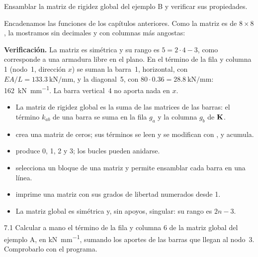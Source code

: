 \begin{problemaresuelto}
Ensamblar la matriz de rigidez global del ejemplo B y verificar sus
propiedades.

\solucion
Encadenamos las funciones de los capítulos anteriores. Como la matriz es de
$8\times8$, la mostramos sin decimales y con columnas más angostas:

\textbf{Verificación.} La matriz es simétrica y su rango es
$5 = 2 \cdot 4 - 3$, como corresponde a una armadura libre en el plano. En el
término de la fila y columna 1 (nodo~1, dirección $x$) se suman la barra~1,
horizontal, con $EA/L = \SI{133.3}{\kilo\newton\per\milli\metre}$, y la
diagonal~5, con $80 \cdot 0.36 = \SI{28.8}{\kilo\newton\per\milli\metre}$:
\SI{162}{\kilo\newton\per\milli\metre}. La barra vertical~4 no aporta nada en
$x$.
\end{problemaresuelto}

\repasoyresumen

\begin{itemize}
  \item La matriz de rigidez global es la suma de las matrices de las barras:
    el término $k_{ab}$ de una barra se suma en la fila $g_a$ y la columna
    $g_b$ de $\mathbf{K}$.
  \item {} crea una matriz de ceros; sus términos se leen y se
    modifican con , y \py{+=} acumula.
  \item {} produce 0, 1, 2 y 3; los bucles pueden anidarse.
  \item {} selecciona un bloque de una matriz y
    permite ensamblar cada barra en una línea.
  \item {} imprime una matriz con sus grados de libertad
    numerados desde 1.
  \item La matriz global es simétrica y, sin apoyos, singular: su rango es
    $2n - 3$.
\end{itemize}

\ejercicios

\begin{ejercicio}{7.1}
Calcular a mano el término de la fila y columna 6 de la matriz global del
ejemplo A, en \si{\kilo\newton\per\milli\metre}, sumando los aportes de las
barras que llegan al nodo~3. Comprobarlo con el programa.
\end{ejercicio}

